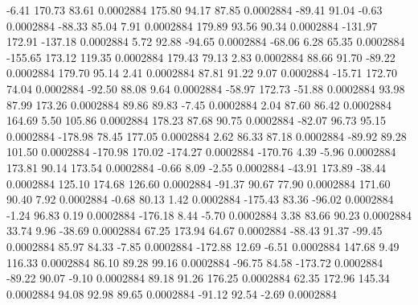        -6.41      170.73       83.61     0.0002884
      175.80       94.17       87.85     0.0002884
      -89.41       91.04       -0.63     0.0002884
      -88.33       85.04        7.91     0.0002884
      179.89       93.56       90.34     0.0002884
     -131.97      172.91     -137.18     0.0002884
        5.72       92.88      -94.65     0.0002884
      -68.06        6.28       65.35     0.0002884
     -155.65      173.12      119.35     0.0002884
      179.43       79.13        2.83     0.0002884
       88.66       91.70      -89.22     0.0002884
      179.70       95.14        2.41     0.0002884
       87.81       91.22        9.07     0.0002884
      -15.71      172.70       74.04     0.0002884
      -92.50       88.08        9.64     0.0002884
      -58.97      172.73      -51.88     0.0002884
       93.98       87.99      173.26     0.0002884
       89.86       89.83       -7.45     0.0002884
        2.04       87.60       86.42     0.0002884
      164.69        5.50      105.86     0.0002884
      178.23       87.68       90.75     0.0002884
      -82.07       96.73       95.15     0.0002884
     -178.98       78.45      177.05     0.0002884
        2.62       86.33       87.18     0.0002884
      -89.92       89.28      101.50     0.0002884
     -170.98      170.02     -174.27     0.0002884
     -170.76        4.39       -5.96     0.0002884
      173.81       90.14      173.54     0.0002884
       -0.66        8.09       -2.55     0.0002884
      -43.91      173.89      -38.44     0.0002884
      125.10      174.68      126.60     0.0002884
      -91.37       90.67       77.90     0.0002884
      171.60       90.40        7.92     0.0002884
       -0.68       80.13        1.42     0.0002884
     -175.43       83.36      -96.02     0.0002884
       -1.24       96.83        0.19     0.0002884
     -176.18        8.44       -5.70     0.0002884
        3.38       83.66       90.23     0.0002884
       33.74        9.96      -38.69     0.0002884
       67.25      173.94       64.67     0.0002884
      -88.43       91.37      -99.45     0.0002884
       85.97       84.33       -7.85     0.0002884
     -172.88       12.69       -6.51     0.0002884
      147.68        9.49      116.33     0.0002884
       86.10       89.28       99.16     0.0002884
      -96.75       84.58     -173.72     0.0002884
      -89.22       90.07       -9.10     0.0002884
       89.18       91.26      176.25     0.0002884
       62.35      172.96      145.34     0.0002884
       94.08       92.98       89.65     0.0002884
      -91.12       92.54       -2.69     0.0002884
